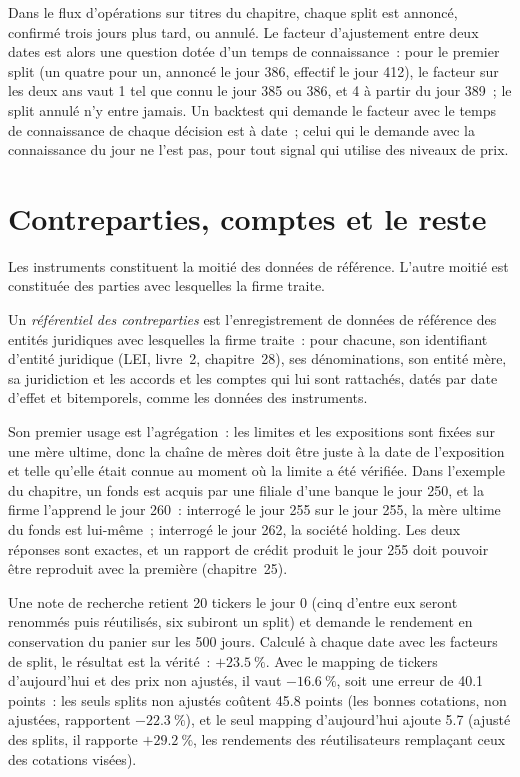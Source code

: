 Dans le flux d'opérations sur titres du chapitre, chaque split est annoncé, confirmé trois jours plus tard, ou annulé. Le facteur d'ajustement
entre deux dates est alors une question dotée d'un temps de connaissance~: pour le premier split (un quatre pour un, annoncé le jour 386, effectif
le jour 412), le facteur sur les deux ans vaut 1 tel que connu le jour 385 ou 386, et 4 à partir du jour 389~; le split annulé n'y
entre jamais. Un backtest qui demande le facteur avec le temps de connaissance de chaque décision est à date~; celui qui le demande avec la connaissance du jour
ne l'est pas, pour tout signal qui utilise des niveaux de prix.

\section{Contreparties, comptes et le reste}

Les instruments constituent la moitié des données de référence. L'autre moitié est constituée des parties avec lesquelles la firme traite.

\begin{definition}\label{def:pl:reference-data-and-symbology-services:cpty}
Un \emph{référentiel des contreparties} est l'enregistrement de données de référence des entités juridiques avec lesquelles la firme traite~:
pour chacune, son identifiant d'entité juridique (LEI, livre~2, chapitre~28), ses dénominations, son entité mère, sa juridiction et les accords et
les comptes qui lui sont rattachés, datés par date d'effet et bitemporels, comme les données des instruments.
\end{definition}

Son premier usage est l'agrégation~: les limites et les expositions sont fixées sur une mère ultime, donc la chaîne de mères doit être juste à la date
de l'exposition et telle qu'elle était connue au moment où la limite a été vérifiée. Dans l'exemple du chapitre, un fonds est acquis par une filiale
d'une banque le jour 250, et la firme l'apprend le jour 260~: interrogé le jour 255 sur le jour 255, la mère ultime du fonds est lui-même~; interrogé le jour 262,
la société holding. Les deux réponses sont exactes, et un rapport de crédit produit le jour 255 doit pouvoir être reproduit avec la première
(chapitre~25).

\begin{example}\label{ex:pl:reference-data-and-symbology-services:basket}
Une note de recherche retient 20 tickers le jour 0 (cinq d'entre eux seront renommés puis réutilisés, six subiront un split) et demande
le rendement en conservation du panier sur les 500 jours. Calculé à chaque date avec les facteurs de split, le résultat est la vérité~: $+23.5~\%$. Avec le
mapping de tickers d'aujourd'hui et des prix non ajustés, il vaut $-16.6~\%$, soit une erreur de 40.1 points~: les seuls splits non ajustés coûtent 45.8 points
(les bonnes cotations, non ajustées, rapportent $-22.3~\%$), et le seul mapping d'aujourd'hui ajoute 5.7 (ajusté des splits, il rapporte $+29.2~\%$, les
rendements des réutilisateurs remplaçant ceux des cotations visées).
\end{example}

